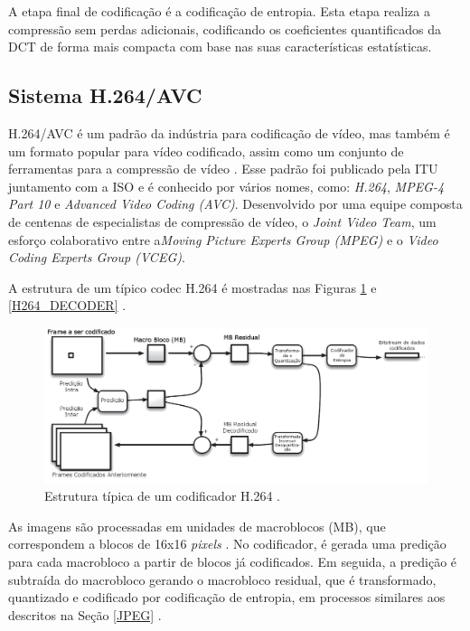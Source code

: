A etapa final de codificação é a codificação de entropia.  Esta etapa realiza a compressão sem perdas adicionais, codificando os coeficientes quantificados da DCT de forma mais compacta com base nas suas características estatísticas.

\subsection{Sistema H.264/AVC} \label{H264}

H.264/AVC é um padrão da indústria para codificação de vídeo, mas também é um formato popular para vídeo codificado, assim como um conjunto de ferramentas para a compressão de vídeo \cite{richardson2011h}. Esse padrão foi publicado pela ITU juntamento com a ISO e é conhecido por vários nomes, como: \textit{H.264}, \textit{MPEG-4 Part 10} e \textit{Advanced Video Coding (AVC)}. Desenvolvido por uma equipe composta de centenas de especialistas de compressão de vídeo, o \textit{Joint Video Team}, um esforço colaborativo entre a\textit{Moving Picture Experts Group (MPEG)} e o \textit{Video Coding Experts Group (VCEG)}.

A estrutura de um típico codec H.264 é mostradas nas Figuras \ref{H264_ENCODER} e \ref{H264_DECODER} \cite{richardson2011h}.

\begin{figure}[h]
	\centering
	\includegraphics[scale=0.45]{figuras/H264_CODIFICADOR.png}
	\caption{Estrutura típica de um codificador H.264 \cite{richardson2011h}.}
	\label{H264_ENCODER}
\end{figure}

As imagens são processadas em unidades de macroblocos (MB), que correspondem a blocos de 16x16 \textit{pixels} \cite{richardson2011h}. No codificador, é gerada uma predição para cada macrobloco a partir de blocos já codificados. Em seguida, a predição é subtraída do macrobloco gerando o macrobloco residual, que é transformado, quantizado e codificado por codificação de entropia, em processos similares aos descritos na Seção \ref{JPEG} .


